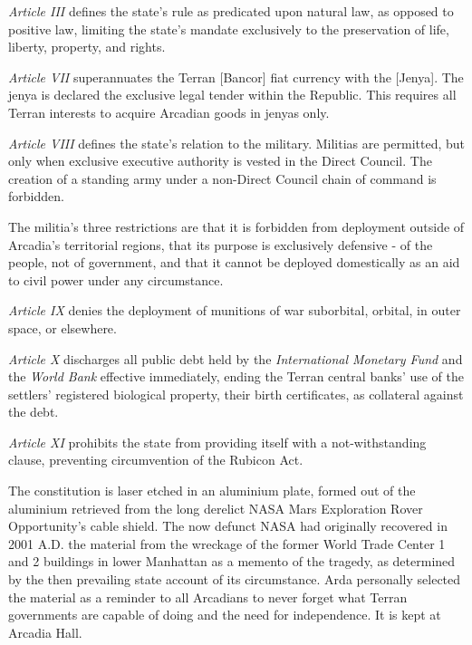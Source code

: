 \item {\it Article III} defines the state's rule as predicated upon natural law, as opposed to positive law, limiting the state's mandate exclusively to the preservation of life, liberty, property, and rights.

\item {\it Article VII} superannuates the Terran [Bancor] fiat currency with the [Jenya]. The jenya is declared the exclusive legal tender within the Republic. This requires all Terran interests to acquire Arcadian goods in jenyas only.

\item {\it Article VIII} defines the state's relation to the military. Militias are permitted, but only when exclusive executive authority is vested in the Direct Council. The creation of a standing army under a non-Direct Council chain of command is forbidden.

The militia's three restrictions are that it is forbidden from deployment outside of Arcadia's territorial regions, that its purpose is exclusively defensive - of the people, not of government, and that it cannot be deployed domestically as an aid to civil power under any circumstance.

\item {\it Article IX} denies the deployment of munitions of war suborbital, orbital, in outer space, or elsewhere.

\item {\it Article X} discharges all public debt held by the {\it International Monetary Fund} and the {\it World Bank} effective immediately, ending the Terran central banks' use of the settlers' registered biological property, their birth certificates, as collateral against the debt.

\item {\it Article XI} prohibits the state from providing itself with a not-withstanding clause, preventing circumvention of the Rubicon Act.
\stopitemize
\stopTimelineDocument
\crlf

The constitution is laser etched in an aluminium plate, formed out of the aluminium retrieved from the long derelict NASA Mars Exploration Rover Opportunity's cable shield. The now defunct NASA had originally recovered in 2001 A.D. the material from the wreckage of the former World Trade Center 1 and 2 buildings in lower Manhattan as a memento of the tragedy, as determined by the then prevailing state account of its circumstance. Arda personally selected the material as a reminder to all Arcadians to never forget what Terran governments are capable of doing and the need for independence. It is kept at Arcadia Hall.

